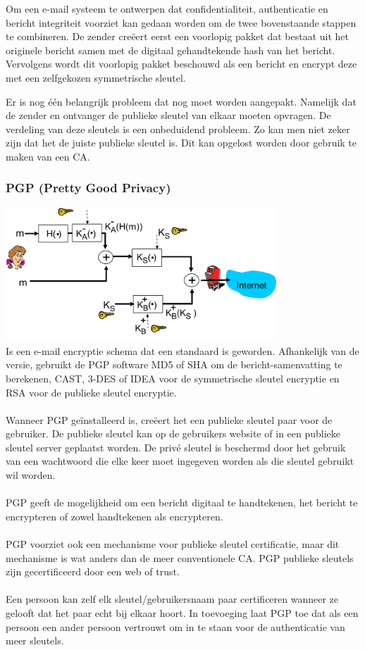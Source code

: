 Om een e-mail systeem te ontwerpen dat confidentialiteit, authenticatie en bericht integriteit voorziet kan gedaan worden om de twee bovenstaande stappen te combineren. De zender creëert eerst een voorlopig pakket dat bestaat uit het originele bericht samen met de digitaal gehandtekende hash van het bericht. Vervolgens wordt dit voorlopig pakket beschouwd als een bericht en encrypt deze met een zelfgekozen symmetrische sleutel.

Er is nog één belangrijk probleem dat nog moet worden aangepakt. Namelijk dat de zender en ontvanger de publieke sleutel van elkaar moeten opvragen. De verdeling van deze sleutels is  een onbeduidend probleem. Zo kan men niet zeker zijn dat het de juiste publieke sleutel is. Dit kan opgelost worden door gebruik te maken van een CA.

\subsubsection{PGP (Pretty Good Privacy)}

\includegraphics[width=4in]{./img/imghfdst8/hfdst8puntje26.png}\\[1cm]
 

Is een e-mail encryptie schema dat een standaard is geworden. Afhankelijk van de versie, gebruikt de PGP software MD5 of SHA om de bericht-samenvatting te berekenen, CAST, 3-DES of IDEA voor de symmetrische sleutel encryptie en RSA voor de publieke sleutel encryptie.
\\\\
Wanneer PGP geïnstalleerd is, creëert het een publieke sleutel paar voor de gebruiker. De publieke sleutel kan op de gebruikers website of in een publieke sleutel server geplaatst worden. De privé sleutel is beschermd door het gebruik van een wachtwoord die elke keer moet ingegeven worden als die sleutel gebruikt wil worden.
\\\\
PGP geeft de mogelijkheid om een bericht digitaal te handtekenen, het bericht te encrypteren of zowel handtekenen als encrypteren.
\\\\
PGP voorziet ook een mechanisme voor publieke sleutel certificatie, maar dit mechanisme is wat anders dan de meer conventionele CA. PGP publieke sleutels zijn gecertificeerd door een web of trust. 
\\\\
Een persoon kan zelf elk sleutel/gebruikersnaam paar certificeren wanneer ze gelooft dat het paar echt bij elkaar hoort. In toevoeging laat PGP toe dat als een persoon een ander persoon vertrouwt om in te staan voor de authenticatie van meer sleutels.
